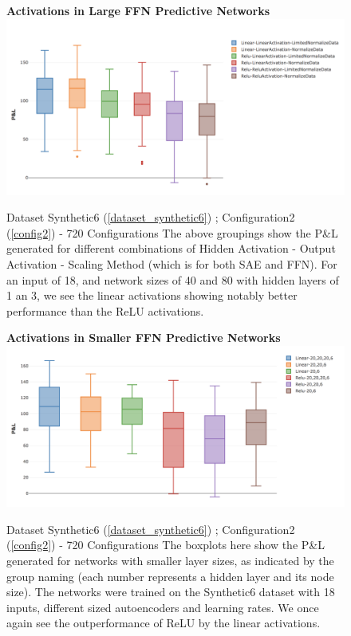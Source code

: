 \documentclass[a4paper,11pt,oneside]{article}
\theoremstyle{plain}
\theoremstyle{definition}
\begin{document}
\begin{figure}[H]
	\centering 
	\textbf{Activations in Large FFN Predictive Networks}
	\includegraphics[scale=0.4]{images/results/linearity/5Linear_Scaling_Profits.png}
		\caption{Dataset Synthetic6  (\ref{dataset_synthetic6}) ; Configuration2 (\ref{config2}) - 720 Configurations
			\newline \newline The above groupings show the P\&L generated for different combinations of Hidden Activation - Output Activation - Scaling Method (which is for both SAE and FFN). For an input of 18, and network sizes of 40 and 80 with hidden layers of 1 an 3, we see the linear activations showing notably better performance than the ReLU activations.
		}	
		\label{figure-results-linear-ffn_activations}
\end{figure}


\begin{figure}[H]
	\centering 
	\textbf{Activations in Smaller FFN Predictive Networks}
	\includegraphics[scale=0.4]{images/results/linearity/6Small_Network_Scaling_Profits.png}
	\caption{Dataset Synthetic6  (\ref{dataset_synthetic6}) ; Configuration2 (\ref{config2}) - 720 Configurations
		\newline \newline The boxplots here show the P\&L generated for networks with smaller layer sizes, as indicated by the group naming (each number represents a hidden layer and its node size). The networks were trained on the Synthetic6 dataset with 18 inputs, different sized autoencoders and learning rates. We once again see the outperformance of ReLU by the linear activations.}
	\label{figure-results_linear_vs_relu}
\end{figure}
\end{document}
